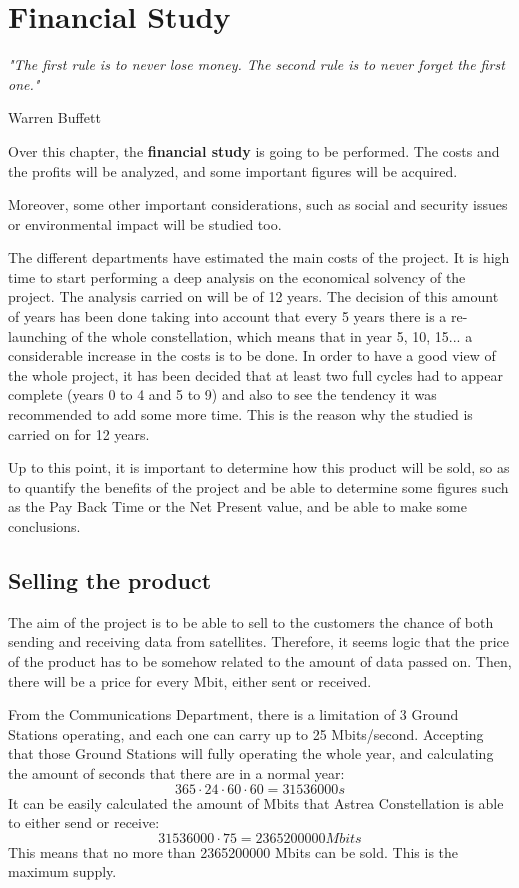\chapter{Financial Study}

\epigraph{\textit{"The first rule is to never lose money. The second rule is to never forget the first one."}}{Warren Buffett} 

Over this chapter, the \textbf{financial study} is going to be performed. The costs and the profits will be analyzed, and some important figures will be acquired. 

Moreover, some other important considerations, such as social and security issues or environmental impact will be studied too.

The different departments have estimated the main costs of the project. It is high time to start performing a deep analysis on the economical solvency of the project. The analysis carried on will be of 12 years. The decision of this amount of years has been done taking into account that every 5 years there is a re-launching of the whole constellation, which means that in year 5, 10, 15... a considerable increase in the costs is to be done. In order to have a good view of the whole project, it has been decided that at least two full cycles had to appear complete (years 0 to 4 and 5 to 9) and also to see the tendency it was recommended to add some more time. This is the reason why the studied is carried on for 12 years. 

Up to this point, it is important to determine how this product will be sold, so as to quantify the benefits of the project and be able to determine some figures such as the Pay Back Time or the Net Present value, and be able to make some conclusions. 

\section{Selling the product}

The aim of the project is to be able to sell to the customers the chance of both sending and receiving data from satellites. Therefore, it seems logic that the price of the product has to be somehow related to the amount of data passed on. Then, there will be a price for every Mbit, either sent or received. 

From the Communications Department, there is a limitation of 3 Ground Stations operating, and each one can carry up to 25 Mbits/second. Accepting that those Ground Stations will fully operating the whole year, and calculating the amount of seconds that there are in a normal year:
\begin{equation}
365 \cdot 24 \cdot 60 \cdot 60 = 31536000 s
\end{equation}
It can be easily calculated the amount of Mbits that Astrea Constellation is able to either send or receive:
\begin{equation}
31536000 \cdot 75 = 2365200000 Mbits
\end{equation}
This means that no more than 2365200000 Mbits can be sold. This is the maximum supply.

